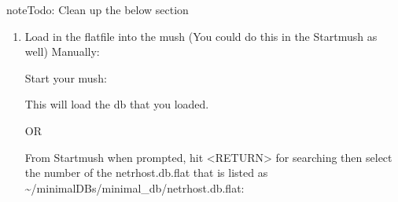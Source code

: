 \documentclass[letterpaper,10pt,english]{sphinxmanual}
\begin{document}
\begin{sphinxadmonition}{note}{\label{\detokenize{install:id7}}Todo:}
\sphinxAtStartPar
Clean up the below section
\end{sphinxadmonition}
\begin{enumerate}
%
\item {} 
\sphinxAtStartPar
Load in the flatfile into the mush (You could do this in the Startmush as well)
Manually:

\begin{sphinxVerbatim}[commandchars=\\\{\}]
 
    
\end{sphinxVerbatim}

\sphinxAtStartPar
Start your mush:

\begin{sphinxVerbatim}[commandchars=\\\{\}]
\end{sphinxVerbatim}

\sphinxAtStartPar
This will load the db that you loaded.

\sphinxAtStartPar
\sphinxhyphen{}\sphinxhyphen{}\sphinxhyphen{}\sphinxhyphen{}\sphinxhyphen{}\sphinxhyphen{}\sphinxhyphen{}\sphinxhyphen{}\sphinxhyphen{}\sphinxhyphen{}\sphinxhyphen{}\sphinxhyphen{}\sphinxhyphen{}\sphinxhyphen{}\sphinxhyphen{}OR\sphinxhyphen{}\sphinxhyphen{}\sphinxhyphen{}\sphinxhyphen{}\sphinxhyphen{}\sphinxhyphen{}\sphinxhyphen{}

\sphinxAtStartPar
From Startmush when prompted, hit \textless{}RETURN\textgreater{} for searching then select the number of the netrhost.db.flat that is listed as \textasciitilde{}/minimal\sphinxhyphen{}DBs/minimal\_db/netrhost.db.flat:

\begin{sphinxVerbatim}[commandchars=\\\{\}]
\end{sphinxVerbatim}

\end{enumerate}
\end{document}
